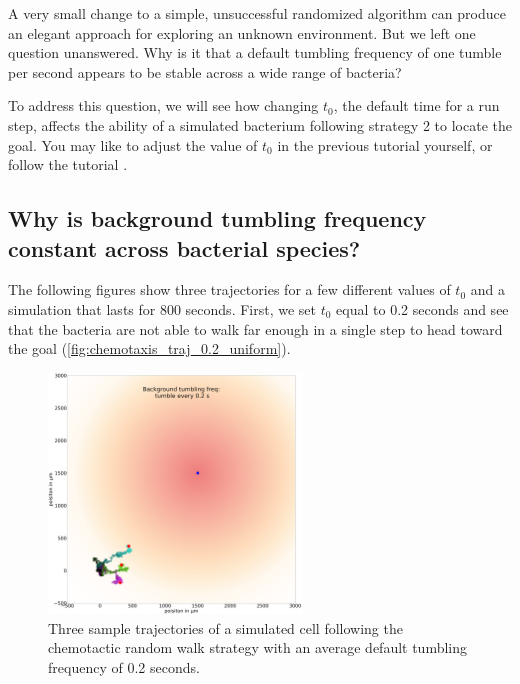 A very small change to a simple, unsuccessful randomized algorithm can produce an elegant approach for exploring an unknown environment. But we left one question unanswered. Why is it that a default tumbling frequency of one tumble per second appears to be stable across a wide range of bacteria?

To address this question, we will see how changing $t_0$, the default time for a run step, affects the ability of a simulated bacterium following strategy 2 to locate the goal. You may like to adjust the value of $t_0$ in the previous tutorial  yourself, or follow the tutorial .


\FloatBarrier
{}
\subsection{Why is background tumbling frequency constant across bacterial species?}


The following figures show three trajectories for a few different values of $t_0$ and a simulation that lasts for 800 seconds. First, we set $t_0$ equal to 0.2 seconds and see that the bacteria are not able to walk far enough in a single step to head toward the goal (\autoref{fig:chemotaxis_traj_0.2_uniform}).

\begin{figure}[h]
\centering
\mySfFamily
\includegraphics[width = 0.6\textwidth]{../images/chemotaxis_traj_0.2_uniform.png}
\caption{Three sample trajectories of a simulated cell following the chemotactic random walk strategy with an average default tumbling frequency of 0.2 seconds.}
\label{fig:chemotaxis_traj_0.2_uniform}
\end{figure}

